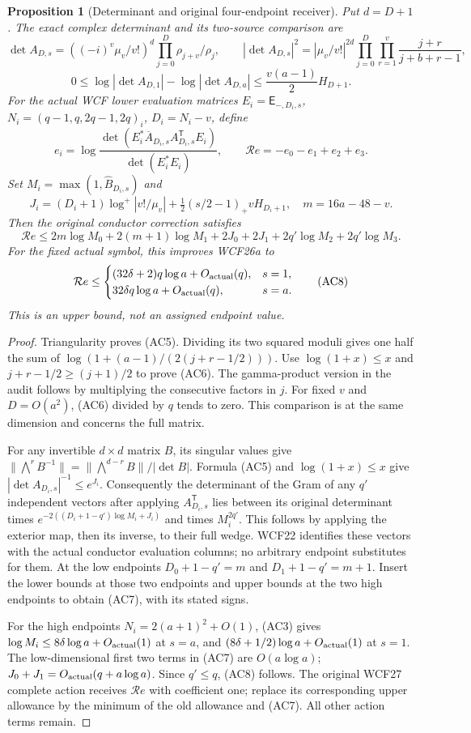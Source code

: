 \documentclass[11pt]{article}
\newtheorem{proposition}[theorem]{Proposition}
\theoremstyle{remark}\newtheorem{remark}[theorem]{Remark}
\begin{document}
\begin{proposition}[Determinant and original four-endpoint receiver]
Put $d=D+1$. The exact complex determinant and its two-source comparison are
\[
 \det A_{D,s}=((-i)^v\mu_v/v!)^d\prod_{j=0}^D\rho_{j+v}/\rho_j,
 \qquad
 |\det A_{D,s}|^2=|\mu_v/v!|^{2d}
 \prod_{j=0}^D\prod_{r=1}^v\frac{j+r}{j+b+r-1},\tag{AC5}
\]
\[
 0\le\log|\det A_{D,1}|-\log|\det A_{D,a}|
 \le\frac{v(a-1)}2 H_{D+1}.\tag{AC6}
\]
For the actual WCF lower evaluation matrices $E_i=\mathsf E_{-,D_i,s}$,
$N_i=(q-1,q,2q-1,2q)_i$, $D_i=N_i-v$, define
\[
 e_i=\log\frac{\det(E_i^*\overline A_{D_i,s}A_{D_i,s}^{\mathsf T}E_i)}
 {\det(E_i^*E_i)},\qquad \mathcal R e=-e_0-e_1+e_2+e_3.
\]
Set $M_i=\max(1,\widehat B_{D_i,s})$ and
\[
 J_i=(D_i+1)\log^+|v!/\mu_v|
       +\tfrac12(s/2-1)_+vH_{D_i+1},\quad m=16a-48-v.
\]
Then the original conductor correction satisfies
\[
 \mathcal R e\le
 2m\log M_0+2(m+1)\log M_1+2J_0+2J_1
 +2q'\log M_2+2q'\log M_3.\tag{AC7}
\]
For the fixed actual symbol, this improves WCF26a to
\[
 \mathcal R e\le
 \begin{cases}
 (32\delta+2)q\log a+O_{\rm actual}(q),&s=1,\\
 32\delta q\log a+O_{\rm actual}(q),&s=a.
 \end{cases}\tag{AC8}
\]
This is an upper bound, not an assigned endpoint value.
\end{proposition}
\begin{proof}
Triangularity proves (AC5). Dividing its two squared moduli gives
one half the sum of
$\log(1+(a-1)/(2(j+r-1/2)))$. Use $\log(1+x)\le x$ and
$j+r-1/2\ge(j+1)/2$ to prove (AC6). The gamma-product version in
the audit follows by multiplying the consecutive factors in $j$.
For fixed $v$ and $D=O(a^2)$, (AC6) divided by $q$ tends to zero.
This comparison is at the same dimension and concerns the full matrix.

For any invertible $d\times d$ matrix $B$, its singular values give
$\|\bigwedge^rB^{-1}\|=\|\bigwedge^{d-r}B\|/|\det B|$.
Formula (AC5) and $\log(1+x)\le x$ give
$|\det A_{D_i,s}|^{-1}\le e^{J_i}$. Consequently the determinant
of the Gram of any $q'$ independent vectors after applying
$A_{D_i,s}^{\mathsf T}$ lies between its original determinant times
$e^{-2((D_i+1-q')\log M_i+J_i)}$ and times $M_i^{2q'}$.
This follows by applying the exterior map, then its inverse, to their
full wedge. WCF22 identifies these vectors with the actual conductor
evaluation columns; no arbitrary endpoint substitutes for them.
At the low endpoints $D_0+1-q'=m$ and $D_1+1-q'=m+1$.
Insert the lower bounds at those two endpoints and upper bounds at the
two high endpoints to obtain (AC7), with its stated signs.

For the high endpoints $N_i=2(a+1)^2+O(1)$, (AC3) gives
$\log M_i\le8\delta\log a+O_{\rm actual}(1)$ at $s=a$, and
$(8\delta+1/2)\log a+O_{\rm actual}(1)$ at $s=1$.
The low-dimensional first two terms in (AC7) are $O(a\log a)$;
$J_0+J_1=O_{\rm actual}(q+a\log a)$. Since $q'\le q$, (AC8)
follows. The original WCF27 complete action receives $\mathcal R e$
with coefficient one; replace its corresponding upper allowance by
the minimum of the old allowance and (AC7). All other action terms remain.
\end{proof}
\end{document}

